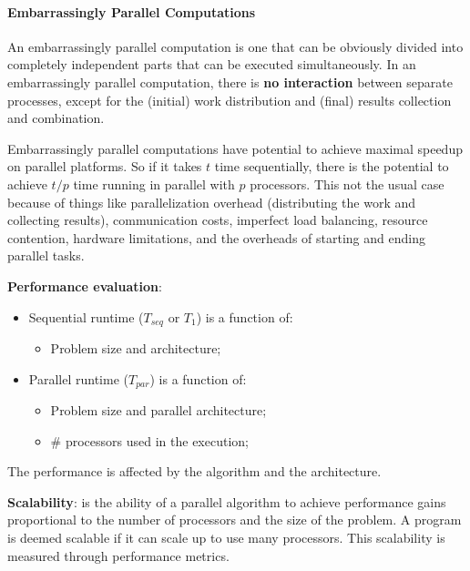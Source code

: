 \paragraph{Embarrassingly Parallel Computations} An embarrassingly parallel computation is one that can be obviously divided into completely independent parts that can be executed simultaneously. In an embarrassingly parallel computation, there is \textbf{no interaction} between separate processes, except for the (initial) work distribution and (final) results collection and combination.
\par Embarrassingly parallel computations have potential to achieve maximal speedup on parallel platforms. So if it takes $t$ time sequentially,  there is the potential to achieve $t/p$ time running in parallel with $p$ processors. This not the usual case because of things like parallelization overhead (distributing the work and collecting results), communication costs, imperfect load balancing, resource contention, hardware limitations, and the overheads of starting and ending parallel tasks.
%
\clearpage
%
\par \textbf{Performance evaluation}:
\begin{itemize}
    \item Sequential runtime ($T_{seq}$ or $T_1$) is a function of:
    \begin{itemize}
        \item Problem size and architecture;
    \end{itemize}
    \item Parallel runtime ($T_{par}$) is a function of:
    \begin{itemize}
        \item Problem size and parallel architecture;
        \item $\#$ processors used in the execution;
    \end{itemize}
\end{itemize}
\par The performance is affected by the algorithm and the architecture.
\par \textbf{Scalability}: is the ability of a parallel algorithm to achieve performance gains proportional to the number of processors and the size of the problem. A program is deemed scalable if it can scale up to use many processors. This scalability is measured through performance metrics.
